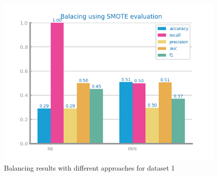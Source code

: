 \documentclass[10pt]{extarticle}
\begin{document}
\begin{figure}[H]
\includegraphics[scale=0.80]{images/dataset1/data_preparation/CovidPos_balancing_SMOTE.png}
\caption{Balancing results with different approaches for dataset 1}
\end{figure}
\end{document}

